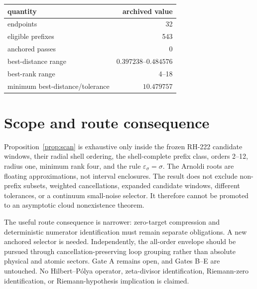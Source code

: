 \documentclass[11pt]{article}
\begin{document}
\begin{center}
\small
\begin{tabular}{lr}
\toprule
quantity & archived value\\
\midrule
endpoints & 32\\
eligible prefixes & 543\\
anchored passes & 0\\
best-distance range & $0.397238$--$0.484576$\\
best-rank range & 4--18\\
minimum best-distance/tolerance & $10.479757$\\
\bottomrule
\end{tabular}
\end{center}

\section{Scope and route consequence}

Proposition~\ref{prop:scan} is exhaustive only inside the frozen RH-222
candidate windows, their radial shell ordering, the shell-complete prefix
class, orders 2--12, radius one, minimum rank four, and the rule
$\varepsilon_\sigma=\sigma$.  The Arnoldi roots are floating approximations,
not interval enclosures.  The result does not exclude non-prefix subsets,
weighted cancellations, expanded candidate windows, different tolerances, or
a continuum small-noise selector.  It therefore cannot be promoted to an
asymptotic cloud nonexistence theorem.

The useful route consequence is narrower: zero-target compression and
deterministic numerator identification must remain separate obligations.  A
new anchored selector is needed.  Independently, the all-order envelope
should be pursued through cancellation-preserving loop grouping rather than
absolute physical and atomic sectors.  Gate A remains open, and Gates B--E
are untouched.  No Hilbert--P\'olya operator, zeta-divisor identification,
Riemann-zero identification, or Riemann-hypothesis implication is claimed.



\end{document}
